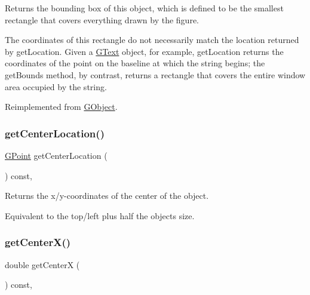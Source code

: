 Returns the bounding box of this object, which is defined to be the smallest rectangle that covers everything drawn by the figure. 

The coordinates of this rectangle do not necessarily match the location returned by {\ttfamily get\+Location}. Given a {\ttfamily \mbox{\hyperlink{classsgl_1_1GText}{G\+Text}}} object, for example, {\ttfamily get\+Location} returns the coordinates of the point on the baseline at which the string begins; the {\ttfamily get\+Bounds} method, by contrast, returns a rectangle that covers the entire window area occupied by the string. 

Reimplemented from \mbox{\hyperlink{classsgl_1_1GObject_a29e6ac35a0b48f491a4c88194cc5da3b}{G\+Object}}.

\mbox{\label{classsgl_1_1GObject_a0909472e91448470bccdb62ecfb95d8b}} 
\subsubsection{\texorpdfstring{get\+Center\+Location()}{getCenterLocation()}}
{\footnotesize\ttfamily \mbox{\hyperlink{structsgl_1_1GPoint}{G\+Point}} get\+Center\+Location (\begin{DoxyParamCaption}{ }\end{DoxyParamCaption}) const\hspace{0.3cm}{\ttfamily [virtual]}, {\ttfamily [inherited]}}



Returns the x/y-\/coordinates of the center of the object. 

Equivalent to the top/left plus half the object\textquotesingle{}s size. \mbox{\label{classsgl_1_1GObject_a04df74355b545e0543112d5b8d924176}} 
\subsubsection{\texorpdfstring{get\+Center\+X()}{getCenterX()}}
{\footnotesize\ttfamily double get\+CenterX (\begin{DoxyParamCaption}{ }\end{DoxyParamCaption}) const\hspace{0.3cm}{\ttfamily [virtual]}, {\ttfamily [inherited]}}



